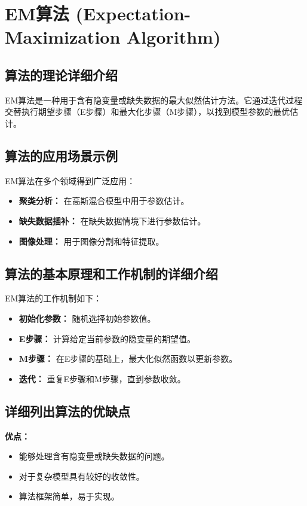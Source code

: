 \section{EM算法 (Expectation-Maximization Algorithm)}
\subsection*{算法的理论详细介绍}
EM算法是一种用于含有隐变量或缺失数据的最大似然估计方法。它通过迭代过程交替执行期望步骤（E步骤）和最大化步骤（M步骤），以找到模型参数的最优估计。

\subsection*{算法的应用场景示例}
EM算法在多个领域得到广泛应用：
\begin{itemize}
    \item \textbf{聚类分析：} 在高斯混合模型中用于参数估计。
    \item \textbf{缺失数据插补：} 在缺失数据情境下进行参数估计。
    \item \textbf{图像处理：} 用于图像分割和特征提取。
\end{itemize}

\subsection*{算法的基本原理和工作机制的详细介绍}
EM算法的工作机制如下：
\begin{itemize}
    \item \textbf{初始化参数：} 随机选择初始参数值。
    \item \textbf{E步骤：} 计算给定当前参数的隐变量的期望值。
    \item \textbf{M步骤：} 在E步骤的基础上，最大化似然函数以更新参数。
    \item \textbf{迭代：} 重复E步骤和M步骤，直到参数收敛。
\end{itemize}

\subsection*{详细列出算法的优缺点}
\textbf{优点：}
\begin{itemize}
    \item 能够处理含有隐变量或缺失数据的问题。
    \item 对于复杂模型具有较好的收敛性。
    \item 算法框架简单，易于实现。
\end{itemize}

